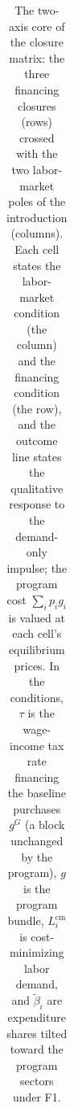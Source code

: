 \begin{table}[htbp]
\begin{tabular}{@{}>{\raggedright\arraybackslash}p{2.2cm}
                  >{\raggedright\arraybackslash}p{6.2cm}
                  >{\raggedright\arraybackslash}p{6.2cm}@{}}
\end{tabular}
\caption{The two-axis core of the closure matrix: the three financing closures
(rows) crossed with the two labor-market poles of the introduction (columns).
Each cell states the labor-market condition (the column) and the financing
condition (the row), and the outcome line states the qualitative response to
the demand-only impulse; the program cost $\sum_i p_i g_i$ is valued at each
cell's equilibrium prices. In the conditions, $\tau$ is the wage-income tax rate financing the
baseline purchases $g^{G}$ (a block unchanged by the program), $g$ is the
program bundle, $L_{i}^{\mathrm{cm}}$ is cost-minimizing labor demand, and
$\tilde\beta_{i}$ are expenditure shares tilted toward the program sectors
under F1.}
\label{tab:closure-conditions}
\end{table}
